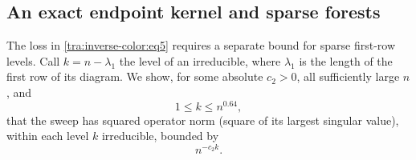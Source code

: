 \subsection{An exact endpoint kernel and sparse forests}
\begin{lemma}\label{tra:inverse-color:sparse}
\label{tra:inverse-color:sparse-statement}
The loss in \eqref{tra:inverse-color:eq5} requires a separate bound for sparse first-row levels. Call \(k=n-\lambda_1\) the level of an irreducible, where \(\lambda_1\) is the length of the first row of its diagram. We show, for some absolute \(c_2>0\), all sufficiently large \(n\), and
\[
                           1\le k\le n^{0.64},
\]
that the sweep has squared operator norm (square of its largest singular value), within each level \(k\) irreducible, bounded by
\begin{equation}
                                      n^{-c_2 k}.                              \label{tra:inverse-color:eq9}
\end{equation}
\end{lemma}
